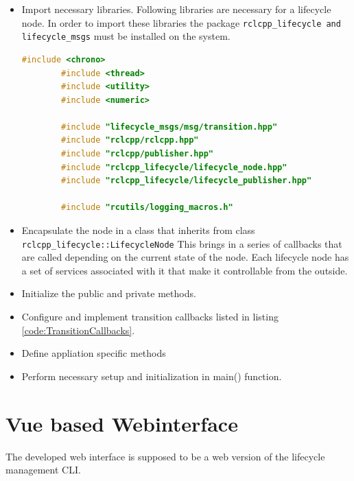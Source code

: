 \begin{itemize}
	\item Import necessary libraries. Following libraries are necessary for a lifecycle node. In order to import these libraries the package \lstinline{rclcpp_lifecycle and lifecycle_msgs} must be installed on the system. \begin{lstlisting}[language=cpp]
		#include <chrono>
		#include <thread>
		#include <utility>
		#include <numeric>

		#include "lifecycle_msgs/msg/transition.hpp"
		#include "rclcpp/rclcpp.hpp"
		#include "rclcpp/publisher.hpp"
		#include "rclcpp_lifecycle/lifecycle_node.hpp"
		#include "rclcpp_lifecycle/lifecycle_publisher.hpp"

		#include "rcutils/logging_macros.h"

	\end{lstlisting}
	\item Encapsulate the node in a class that inherits from class \lstinline{rclcpp_lifecycle::LifecycleNode} This brings in a series of callbacks that are called depending on the current state of the node. Each lifecycle node has a set of services associated with it that make it controllable from the outside.
	\item Initialize the public and private methods.
	\item Configure and implement transition callbacks listed in listing \ref{code:TransitionCallbacks}.
	\item Define appliation specific methods
	\item Perform necessary setup and initialization in main() function.  
\end{itemize}

\section{Vue based Webinterface}
\label{Implementierung:VueBasedWebinterface}
The developed web interface is supposed to be a web version of the lifecycle management CLI. 

